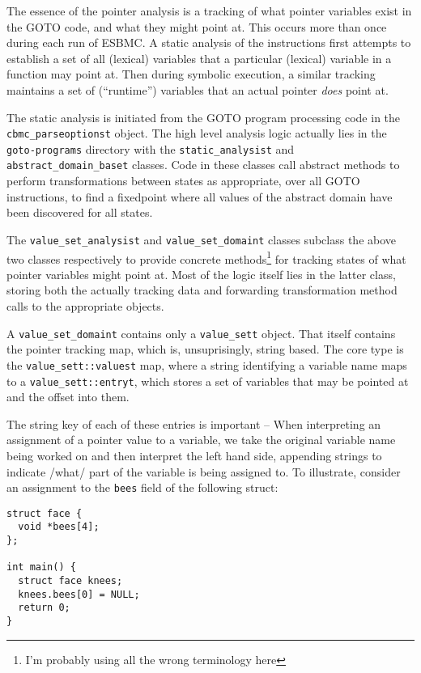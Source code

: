 \documentclass{article}
\begin{document}
The essence of the pointer analysis is a tracking of what pointer variables
exist in the GOTO code, and what they might point at. This occurs more than once
during each run of ESBMC. A static analysis of the instructions first attempts
to establish a set of all (lexical) variables that a particular (lexical)
variable in a function may point at. Then during symbolic execution, a similar
tracking maintains a set of (``runtime'') variables that an actual pointer
\textit{does} point at.

The static analysis is initiated from the GOTO program processing code in the
\texttt{cbmc\_parseoptionst} object. The high level analysis logic actually
lies in the \texttt{goto-programs} directory with the
\texttt{static\_analysist} and \texttt{abstract\_domain\_baset}
classes. Code in these classes call abstract methods to perform transformations 
between states as appropriate, over all GOTO instructions, to find a fixedpoint
where all values of the abstract domain have been discovered for all states.

The \texttt{value\_set\_analysist} and \texttt{value\_set\_domaint} classes
subclass the above two classes respectively to provide concrete
methods\footnote{I'm probably using all the wrong terminology here} for
tracking states of what pointer variables might point at. Most of the logic
itself lies in the latter class, storing both the actually tracking data
and forwarding transformation method calls to the appropriate objects.

A \texttt{value\_set\_domaint} contains only a \texttt{value\_sett} object.
That itself contains the pointer tracking map, which is, unsuprisingly,
string based. The core type is the \texttt{value\_sett::valuest} map,
where a string identifying a variable name maps to a
\texttt{value\_sett::entryt}, which stores a set of variables that may be
pointed at and the offset into them.

The string key of each of these entries is important -- When interpreting 
an assignment of a pointer value to a variable, we take the original variable
name being worked on and then interpret the left hand side, appending strings
to indicate /what/ part of the variable is being assigned to. To illustrate,
consider an assignment to the \texttt{bees} field of the following struct:
\begin{lstlisting}
struct face {
  void *bees[4];
};

int main() {
  struct face knees;
  knees.bees[0] = NULL;
  return 0;
}
\end{lstlisting}
\end{document}

